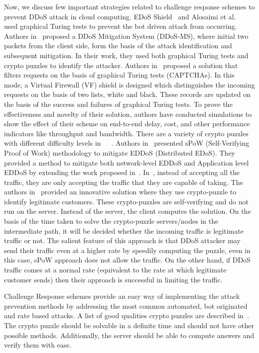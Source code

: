 \documentclass[final,5p,times,twocolumn]{elsarticle}
\begin{document}
Now, we discuss few important strategies related to challenge response schemes to prevent DDoS attack in cloud computing. EDoS Shield~\cite{edosshield} and Alosaimi et al.~\cite{alosaimi} used graphical Turing tests to prevent the bot driven attack from occurring.  Authors in~\cite{alosaimi} proposed a DDoS Mitigation System (DDoS-MS), where initial two packets from the client side, form the basis of the attack identification and subsequent mitigation. In their work, they used both graphical Turing tests and crypto puzzles to identify the attacker. Authors in~\cite{edosshield} proposed a solution that filters requests on the basis of graphical Turing tests (CAPTCHAs). In this mode, a Virtual Firewall (VF) shield is designed which distinguishes the incoming requests on the basis of two lists, white and black. These records are updated on the basis of the success and failures of graphical Turing tests. To prove the effectiveness and novelty of their solution, authors have conducted simulations to show the effect of their scheme on end-to-end delay, cost, and other performance indicators like throughput and bandwidth.  There are a variety of crypto puzzles with different difficulty levels in~\cite{spow}~\cite{scrubber}~\cite{enhanced}. Authors in~\cite{spow} presented sPoW (Self-Verifying Proof of Work) methodology to mitigate EDDoS (Distributed EDoS). They provided a method to mitigate both network-level EDDoS and Application level EDDoS by extending the work proposed in~\cite{capabilities}. In~\cite{capabilities}, instead of accepting all the traffic, they are only accepting the traffic that they are capable of taking. The authors in~\cite{spow} provided an innovative solution where they use crypto-puzzle to identify legitimate customers. These crypto-puzzles are self-verifying and do not run on the server. Instead of the server, the client computes the solution. On the basis of the time taken to solve the crypto-puzzle servers/nodes in the intermediate path, it will be decided whether the incoming traffic is legitimate traffic or not. The salient feature of this approach is that DDoS attacker may send their traffic even at a higher rate by speedily computing the puzzle, even in this case, sPoW approach does not allow the traffic. On the other hand, if DDoS traffic comes at a normal rate (equivalent to the rate at which legitimate customer sends) then their approach is successful in limiting the traffic.

\par {Challenge Response schemes provide an easy way of implementing the attack prevention methods by addressing the most common automated, bot originated and rate based attacks. A list of good qualities crypto puzzles are described in~\cite{tlscrypto}. The crypto puzzle should be solvable in a definite time and should not have other possible methods. Additionally, the server should be able to compute answers and verify them with ease.}
\end{document}
